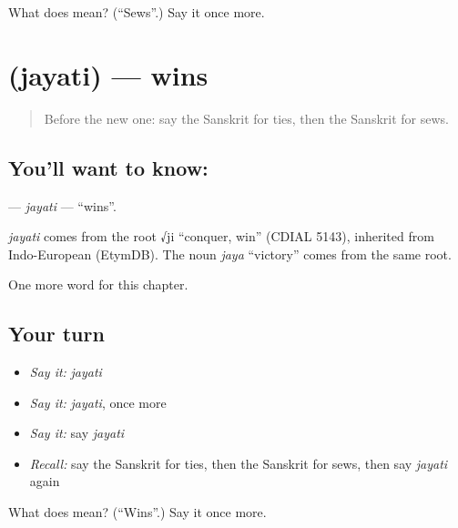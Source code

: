 \begin{tcolorbox}[breakable,colback=teal!4,colframe=teal!35!black,title={Before you move on}]
What does  mean? (\textquotedblleft{}Sews\textquotedblright{}.) Say it once more.
\end{tcolorbox}
\section[\texorpdfstring{\sk{जयति} (jayati)}{जयति (jayati)}]{ (jayati) — wins}

\label{lesson:SA-C137-jayati}



\begin{quote}
Before the new one: say the Sanskrit for ties, then the Sanskrit for sews.
\end{quote}

\subsection*{You'll want to know: }
\textbf{} — \emph{jayati} — \textquotedblleft{}wins\textquotedblright{}.

\begin{cousinweb}
\emph{jayati} comes from the root √ji \textquotedblleft{}conquer, win\textquotedblright{} (CDIAL 5143), inherited from Indo-European (EtymDB). The noun \emph{jaya} \textquotedblleft{}victory\textquotedblright{} comes from the same root.
\end{cousinweb}

\begin{grammarlens}[title={What you've built}]
One more word for this chapter.
\end{grammarlens}

\subsection*{Your turn}
\begin{itemize}
\raggedright
  \item \emph{Say it:} \emph{jayati}
  \item \emph{Say it:} \emph{jayati}, once more
  \item \emph{Say it:} say \emph{jayati}
  \item \emph{Recall:} say the Sanskrit for ties, then the Sanskrit for sews, then say \emph{jayati} again
\end{itemize}

\begin{tcolorbox}[breakable,colback=teal!4,colframe=teal!35!black,title={Before you move on}]
What does  mean? (\textquotedblleft{}Wins\textquotedblright{}.) Say it once more.
\end{tcolorbox}
